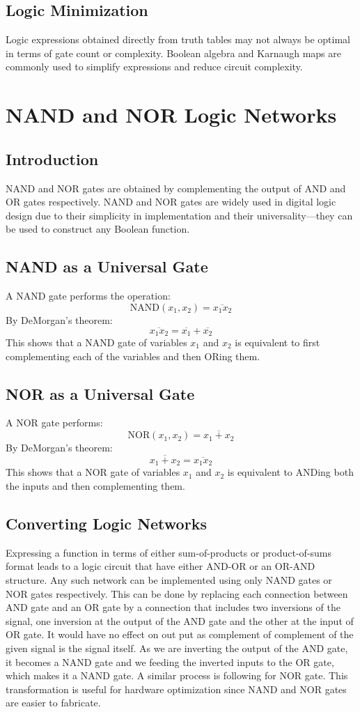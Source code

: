 \documentclass{article}
\begin{document}
\subsection{Logic Minimization}
Logic expressions obtained directly from truth tables may not always be optimal in terms of gate count or complexity. Boolean algebra and Karnaugh maps are commonly used to simplify expressions and reduce circuit complexity.

\section{NAND and NOR Logic Networks}

\subsection{Introduction}
NAND and NOR gates are obtained by complementing the output of AND and OR gates respectively. NAND and NOR gates are widely used in digital logic design due to their simplicity in implementation and their universality—they can be used to construct any Boolean function.

\subsection{NAND as a Universal Gate}
A NAND gate performs the operation:
\[
\text{NAND}(x_1, x_2) = \overline{x_1 x_2}
\]
By DeMorgan’s theorem:
\[
\overline{x_1 x_2} = \overline{x_1} + \overline{x_2}
\]
This shows that a NAND gate of variables $x_1$ and $x_2$ is equivalent to first complementing each of the variables and then ORing them.

\subsection{NOR as a Universal Gate}
A NOR gate performs:
\[
\text{NOR}(x_1, x_2) = \overline{x_1 + x_2}
\]
By DeMorgan's theorem:
\[
\overline{x_1+x_2} = \overline{x_1 x_2}
\]
This shows that a NOR gate of variables $x_1$ and $x_2$ is equivalent to ANDing both the inputs and then complementing them.
\subsection{Converting Logic Networks}
Expressing a function in terms of either sum-of-products or product-of-sums format leads to a logic circuit that have either AND-OR or an OR-AND structure. Any such network can be implemented using only NAND gates or NOR gates respectively. This can be done by replacing each connection between AND gate and an OR gate by a connection that includes two inversions of the signal, one inversion at the output of the AND gate and the other at the input of OR gate. It would have no effect on out put as complement of complement of the given signal is the signal itself. As we are inverting the output of the AND gate, it becomes a NAND gate and we feeding the inverted inputs to the OR gate, which makes it a NAND gate. A similar process is following for NOR gate. This transformation is useful for hardware optimization since NAND and NOR gates are easier to fabricate.
\end{document}
